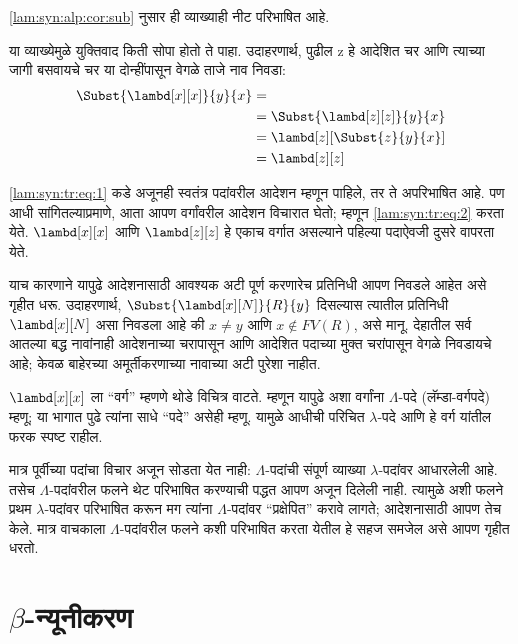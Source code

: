 \ref{lam:syn:alp:cor:sub} नुसार ही व्याख्याही नीट परिभाषित आहे.

या व्याख्येमुळे युक्तिवाद किती सोपा होतो ते पाहा.
उदाहरणार्थ, पुढील z हे आदेशित चर आणि त्याच्या जागी
बसवायचे चर या दोन्हींपासून वेगळे ताजे नाव निवडा:
\begin{align}
  \Subst{\lambd[x][x]}{y}{x} & =\label{lam:syn:tr:eq:1}\\
  &= \Subst{\lambd[z][z]}{y}{x} \label{lam:syn:tr:eq:2}\\
  &= \lambd[z][\Subst{z}{y}{x}] \\
  &= \lambd[z][z]
\end{align}

\ref{lam:syn:tr:eq:1} कडे अजूनही स्वतंत्र पदांवरील आदेशन म्हणून
पाहिले, तर ते अपरिभाषित आहे. पण आधी सांगितल्याप्रमाणे,
आता आपण वर्गांवरील आदेशन विचारात घेतो; म्हणून
\ref{lam:syn:tr:eq:2} करता येते. $\lambd[x][x]$ आणि
$\lambd[z][z]$ हे एकाच वर्गात असल्याने पहिल्या
पदाऐवजी दुसरे वापरता येते.

याच कारणाने यापुढे आदेशनासाठी आवश्यक अटी पूर्ण
करणारेच प्रतिनिधी आपण निवडले आहेत असे गृहीत धरू.
उदाहरणार्थ, $\Subst{\lambd[x][N]}{R}{y}$ दिसल्यास
त्यातील प्रतिनिधी $\lambd[x][N]$ असा निवडला आहे की
$x \neq y$ आणि $x \notin FV(R)$, असे मानू.
देहातील सर्व आतल्या बद्ध नावांनाही आदेशनाच्या चरापासून
आणि आदेशित पदाच्या मुक्त चरांपासून वेगळे निवडायचे आहे;
केवळ बाहेरच्या अमूर्तीकरणाच्या नावाच्या अटी पुरेशा नाहीत.

$\lambd[x][x]$ ला ``वर्ग'' म्हणणे थोडे विचित्र वाटते.
म्हणून यापुढे अशा वर्गांना $\Lambda$-पदे (लॅम्डा-वर्गपदे)
म्हणू; या भागात पुढे त्यांना साधे ``पदे'' असेही म्हणू.
यामुळे आधीची परिचित $\lambda$-पदे आणि हे वर्ग
यांतील फरक स्पष्ट राहील.

\begin{editorial}
  मात्र पूर्वीच्या पदांचा विचार अजून सोडता येत नाही:
  $\Lambda$-पदांची संपूर्ण व्याख्या $\lambda$-पदांवर
  आधारलेली आहे. तसेच $\Lambda$-पदांवरील फलने थेट
  परिभाषित करण्याची पद्धत आपण अजून दिलेली नाही.
  त्यामुळे अशी फलने प्रथम $\lambda$-पदांवर परिभाषित
  करून मग त्यांना $\Lambda$-पदांवर ``प्रक्षेपित'' करावे
  लागते; आदेशनासाठी आपण तेच केले. मात्र वाचकाला
  $\Lambda$-पदांवरील फलने कशी परिभाषित करता येतील
  हे सहज समजेल असे आपण गृहीत धरतो.
\end{editorial}










\section{$\beta$-न्यूनीकरण}\label{lam:int:bet:sec}


